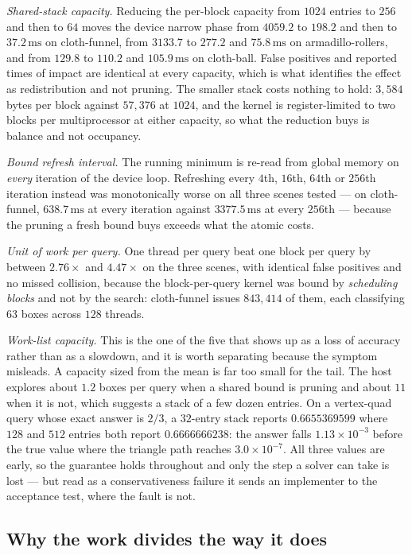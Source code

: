 \emph{Shared-stack capacity.} Reducing the per-block capacity from $1024$
entries to $256$ and then to $64$ moves the device narrow phase from $4059.2$ to
$198.2$ and then to $37.2\,\mathrm{ms}$ on cloth-funnel, from $3133.7$ to
$277.2$ and $75.8\,\mathrm{ms}$ on armadillo-rollers, and from $129.8$ to
$110.2$ and $105.9\,\mathrm{ms}$ on cloth-ball. False positives and reported
times of impact are identical at every capacity, which is what identifies the
effect as redistribution and not pruning. The smaller stack costs nothing to hold: $3{,}584$
bytes per block against $57{,}376$ at $1024$, and the kernel is register-limited
to two blocks per multiprocessor at either capacity, so what the reduction buys
is balance and not occupancy.

\emph{Bound refresh interval.} The running minimum is re-read from global memory
on \emph{every} iteration of the device loop. Refreshing every $4$th, $16$th,
$64$th or $256$th iteration instead was monotonically worse on all three scenes
tested --- on cloth-funnel, $638.7\,\mathrm{ms}$ at every iteration against
$3377.5\,\mathrm{ms}$ at every $256$th --- because the pruning a fresh bound buys
exceeds what the atomic costs.

\emph{Unit of work per query.} One thread per query beat one block per query by
between $2.76\times$ and $4.47\times$ on the three scenes, with identical false
positives and no missed collision, because the block-per-query kernel was bound
by \emph{scheduling blocks} and not by the search: cloth-funnel issues $843{,}414$
of them, each classifying $63$ boxes across $128$ threads.

\emph{Work-list capacity.} This is the one of the five that shows up as a loss
of accuracy rather than as a slowdown, and it is worth separating because the
symptom misleads. A capacity sized from the mean is far too small for the tail. The host explores about $1.2$ boxes
per query when a shared bound is pruning and about $11$ when it is not, which
suggests a stack of a few dozen entries. On a vertex-quad query whose exact
answer is $2/3$, a $32$-entry stack reports $0.6655369599$ where $128$ and $512$
entries both report $0.6666666238$: the answer falls $1.13\times10^{-3}$ before
the true value where the triangle path reaches $3.0\times10^{-7}$. All three
values are early, so the guarantee holds throughout and only the step a solver
can take is lost --- but read as a conservativeness failure it sends an
implementer to the acceptance test, where the fault is not.

\subsection{Why the work divides the way it does}
\label{sec:parallel:why}

